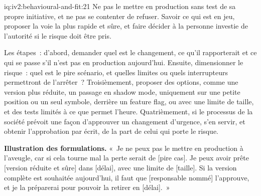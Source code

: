 \begin{solution}{iq:iv2:behavioural-and-fit:21}
Ne pas le mettre en production sans test de sa propre initiative, et ne pas se contenter de refuser. Savoir ce qui est en jeu, proposer la voie la plus rapide et sûre, et faire décider à la personne investie de l'autorité si le risque doit être pris.

Les étapes~: d'abord, demander quel est le changement, ce qu'il rapporterait et ce qui se passe s'il n'est pas en production aujourd'hui. Ensuite, dimensionner le risque~: quel est le pire scénario, et quelles limites ou quels interrupteurs permettront de l'arrêter~? Troisièmement, proposer des options, comme une version plus réduite, un passage en shadow mode, uniquement sur une petite position ou un seul symbole, derrière un feature flag, ou avec une limite de taille, et des tests limités à ce que permet l'heure. Quatrièmement, si le processus de la société prévoit une façon d'approuver un changement d'urgence, s'en servir, et obtenir l'approbation par écrit, de la part de celui qui porte le risque.

\textbf{Illustration des formulations.} «~Je ne peux pas le mettre en production à l'aveugle, car si cela tourne mal la perte serait de [pire cas]. Je peux avoir prête [version réduite et sûre] dans [délai], avec une limite de [taille]. Si la version complète est souhaitée aujourd'hui, il faut que [responsable nommé] l'approuve, et je la préparerai pour pouvoir la retirer en [délai].~»

\end{solution}

